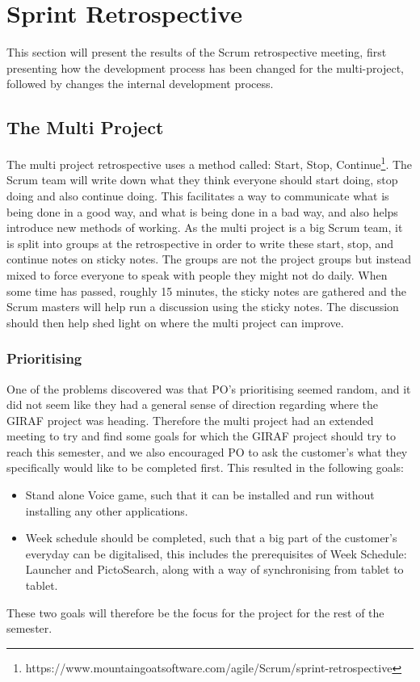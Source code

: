 \section{Sprint Retrospective}\label{s1retro}
This section will present the results of the Scrum retrospective meeting, first presenting how the development process has been changed for the multi-project, followed by changes the internal development process.

\subsection{The Multi Project}\label{retro1}
The multi project retrospective uses a method called: Start, Stop, Continue\footnote{https://www.mountaingoatsoftware.com/agile/Scrum/sprint-retrospective}.
The Scrum team will write down what they think everyone should start doing, stop doing and also continue doing. 
This facilitates a way to communicate what is being done in a good way, and what is being done in a bad way, and also helps introduce new methods of working.
As the multi project is a big Scrum team, it is split into groups at the retrospective in order to write these start, stop, and continue notes on sticky notes.
The groups are not the project groups but instead mixed to force everyone to speak with people they might not do daily.
When some time has passed, roughly 15 minutes, the sticky notes are gathered and the Scrum masters will help run a discussion using the sticky notes.
The discussion should then help shed light on where the multi project can improve.

\subsubsection{Prioritising} 
One of the problems discovered was that PO's prioritising seemed random, and it did not seem like they had a general sense of direction regarding where the GIRAF project was heading.
Therefore the multi project had an extended meeting to try and find some goals for which the GIRAF project should try to reach this semester, and we also encouraged PO to ask the customer's what they specifically would like to be completed first.
This resulted in the following goals:
\begin{itemize}
	\item Stand alone Voice game, such that it can be installed and run without installing any other applications.
	\item Week schedule should be completed, such that a big part of the customer's everyday can be digitalised, this includes the prerequisites of Week Schedule: Launcher and PictoSearch, along with a way of synchronising from tablet to tablet.
\end{itemize}
These two goals will therefore be the focus for the project for the rest of the semester. 

